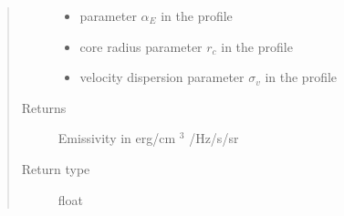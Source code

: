\documentclass[letterpaper,10pt,english]{sphinxmanual}
\begin{document}
\begin{fulllineitems}
\begin{quote}
\begin{description}
\begin{itemize}
\item {} 
\sphinxAtStartPar
{} \textendash{} parameter \(\alpha_E\) in the {\hyperref[\detokenize{diffsph.profiles:diffsph.profiles.templates.enst}]{}} profile

\item {} 
\sphinxAtStartPar
{} \textendash{} core radius parameter \(r_c\) in the {\hyperref[\detokenize{diffsph.profiles:diffsph.profiles.templates.cnfw}]{}} profile

\item {} 
\sphinxAtStartPar
{} \textendash{} velocity dispersion parameter \(\sigma_v\) in the {\hyperref[\detokenize{diffsph.profiles:diffsph.profiles.templates.sis}]{}} profile

\end{itemize}

\item[{Returns}] \leavevmode
\sphinxAtStartPar
Emissivity in erg/cm \({}^3\) /Hz/s/sr

\item[{Return type}] \leavevmode
\sphinxAtStartPar
float

\end{description}\end{quote}

\end{fulllineitems}

\end{document}
